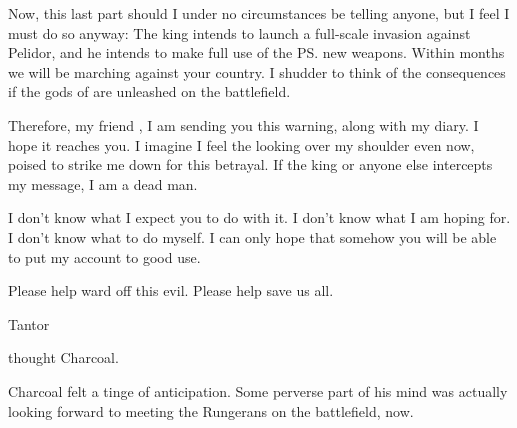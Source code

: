 \begin{diary}
  Now, this last part should I under no circumstances be telling anyone, but I feel I must do so anyway: 
  The king intends to launch a full-scale invasion against Pelidor, and he intends to make full use of the \ps{\ishrah} new weapons. 
  Within months we will be marching against your country. 
  I shudder to think of the consequences if the gods of \EreshKal{} are unleashed on the battlefield. 

  Therefore, my friend \Ambrose, I am sending you this warning, along with my diary. 
  I hope it reaches you. 
  I imagine I feel the \daemons{} looking over my shoulder even now, poised to strike me down for this betrayal. 
  If the king or anyone else intercepts my message, I am a dead man. 

  I don't know what I expect you to do with it. 
  I don't know what I am hoping for. 
  I don't know what to do myself. 
  I can only hope that somehow you will be able to put my account to good use. 

  Please help ward off this evil. 
  Please help save us all. 

  \begin{flushright}
  \Jirad{} Tantor
  \end{flushright}
\end{diary}









\noindent
{} thought Charcoal. 


Charcoal felt a tinge of anticipation. 
Some perverse part of his mind was actually looking forward to meeting the Rungerans on the battlefield, now. 










